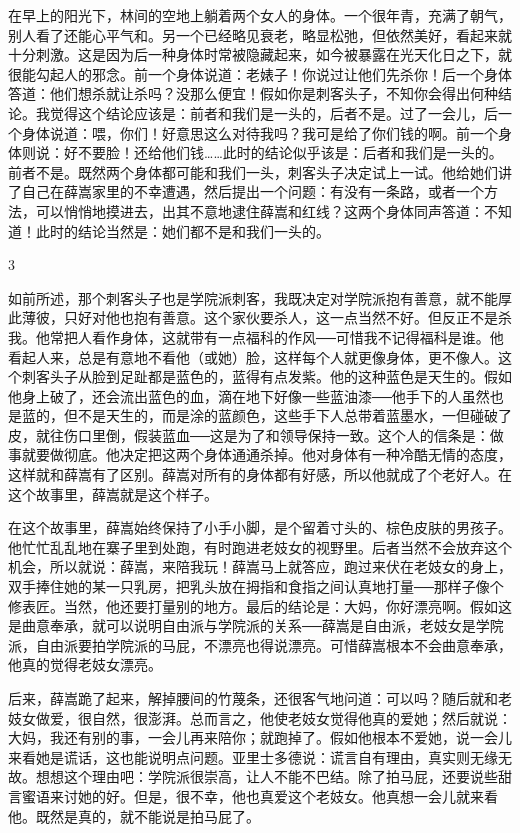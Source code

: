 在早上的阳光下，林间的空地上躺着两个女人的身体。一个很年青，充满了朝气，别人看了还能心平气和。另一个已经略见衰老，略显松弛，但依然美好，看起来就十分刺激。这是因为后一种身体时常被隐藏起来，如今被暴露在光天化日之下，就很能勾起人的邪念。前一个身体说道：老婊子！你说过让他们先杀你！后一个身体答道：他们想杀就让杀吗？没那么便宜！假如你是刺客头子，不知你会得出何种结论。我觉得这个结论应该是：前者和我们是一头的，后者不是。过了一会儿，后一个身体说道：喂，你们！好意思这么对待我吗？我可是给了你们钱的啊。前一个身体则说：好不要脸！还给他们钱……此时的结论似乎该是：后者和我们是一头的。前者不是。既然两个身体都可能和我们一头，刺客头子决定试上一试。他给她们讲了自己在薛嵩家里的不幸遭遇，然后提出一个问题：有没有一条路，或者一个方法，可以悄悄地摸进去，出其不意地逮住薛嵩和红线？这两个身体同声答道：不知道！此时的结论当然是：她们都不是和我们一头的。 

3 

如前所述，那个刺客头子也是学院派刺客，我既决定对学院派抱有善意，就不能厚此薄彼，只好对他也抱有善意。这个家伙要杀人，这一点当然不好。但反正不是杀我。他常把人看作身体，这就带有一点福科的作风──可惜我不记得福科是谁。他看起人来，总是有意地不看他（或她）脸，这样每个人就更像身体，更不像人。这个刺客头子从脸到足趾都是蓝色的，蓝得有点发紫。他的这种蓝色是天生的。假如他身上破了，还会流出蓝色的血，滴在地下好像一些蓝油漆──他手下的人虽然也是蓝的，但不是天生的，而是涂的蓝颜色，这些手下人总带着蓝墨水，一但碰破了皮，就往伤口里倒，假装蓝血──这是为了和领导保持一致。这个人的信条是：做事就要做彻底。他决定把这两个身体通通杀掉。他对身体有一种冷酷无情的态度，这样就和薛嵩有了区别。薛嵩对所有的身体都有好感，所以他就成了个老好人。在这个故事里，薛嵩就是这个样子。 

在这个故事里，薛嵩始终保持了小手小脚，是个留着寸头的、棕色皮肤的男孩子。他忙忙乱乱地在寨子里到处跑，有时跑进老妓女的视野里。后者当然不会放弃这个机会，所以就说：薛嵩，来陪我玩！薛嵩马上就答应，跑过来伏在老妓女的身上，双手捧住她的某一只乳房，把乳头放在拇指和食指之间认真地打量──那样子像个修表匠。当然，他还要打量别的地方。最后的结论是：大妈，你好漂亮啊。假如这是曲意奉承，就可以说明自由派与学院派的关系──薛嵩是自由派，老妓女是学院派，自由派要拍学院派的马屁，不漂亮也得说漂亮。可惜薛嵩根本不会曲意奉承，他真的觉得老妓女漂亮。 

后来，薛嵩跪了起来，解掉腰间的竹蔑条，还很客气地问道：可以吗？随后就和老妓女做爱，很自然，很澎湃。总而言之，他使老妓女觉得他真的爱她；然后就说：大妈，我还有别的事，一会儿再来陪你；就跑掉了。假如他根本不爱她，说一会儿来看她是谎话，这也能说明点问题。亚里士多德说：谎言自有理由，真实则无缘无故。想想这个理由吧：学院派很崇高，让人不能不巴结。除了拍马屁，还要说些甜言蜜语来讨她的好。但是，很不幸，他也真爱这个老妓女。他真想一会儿就来看他。既然是真的，就不能说是拍马屁了。 

